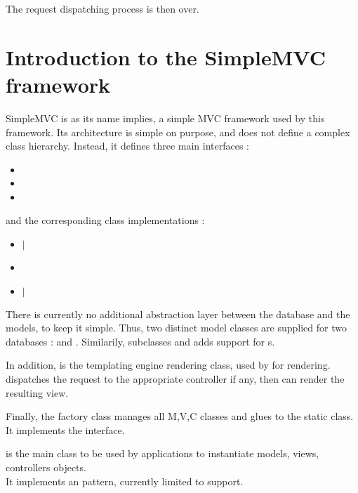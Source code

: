 \documentclass[pdftex,12pt,a4paper]{article}
\begin{document}
The request dispatching process is then over.



\section{Introduction to the SimpleMVC framework} \label{sec:introduction-to-the-simplemvc-framework}

SimpleMVC is as its name implies, a simple MVC framework used by this framework.
Its architecture is simple on purpose, and does not define a complex class hierarchy.
Instead, it defines three main interfaces :
\begin{itemize}
    \item {}
    \item {}
    \item {}
\end{itemize}
and the corresponding class implementations :
\begin{itemize}
    \item {} $|$ 
    \item {}
    \item {} $|$ 
\end{itemize}
There is currently no additional abstraction layer between the database and the models, to keep
it simple. Thus, two distinct model classes are supplied for two databases :  and .
Similarily,  subclasses  and adds support for s.

In addition,  is the templating engine rendering class, used by  for rendering. \\
 dispatches the request to the appropriate controller if any, then can render the resulting view.

Finally, the factory class  manages all M,V,C classes and glues  to the  static class. \\
It implements the  interface.

 is the main class to be used by applications to instantiate models, views, controllers objects. \\
It implements an  pattern, currently limited to  support.
\end{document}
